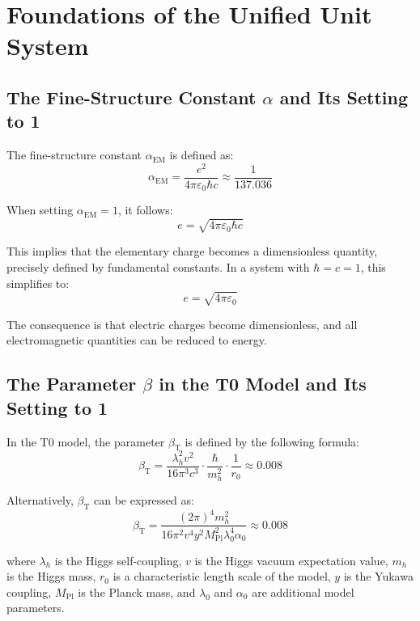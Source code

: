 \documentclass[12pt,a4paper]{article}
\newcommand{\alphaEM}{\alpha_{\text{EM}}}
\newcommand{\betaT}{\beta_{\text{T}}}
\newcommand{\Mpl}{M_{\text{Pl}}}
\begin{document}
	\section{Foundations of the Unified Unit System}
	
	\subsection{The Fine-Structure Constant \(\alpha\) and Its Setting to 1}
	
	The fine-structure constant \(\alphaEM\) is defined as:
	\begin{equation}
		\alphaEM = \frac{e^2}{4\pi\varepsilon_0 \hbar c} \approx \frac{1}{137.036}
	\end{equation}
	
	When setting \(\alphaEM = 1\), it follows:
	\begin{equation}
		e = \sqrt{4\pi\varepsilon_0 \hbar c}
	\end{equation}
	
	This implies that the elementary charge becomes a dimensionless quantity, precisely defined by fundamental constants. In a system with \(\hbar = c = 1\), this simplifies to:
	\begin{equation}
		e = \sqrt{4\pi\varepsilon_0}
	\end{equation}
	
	The consequence is that electric charges become dimensionless, and all electromagnetic quantities can be reduced to energy.
	
	\subsection{The Parameter \(\beta\) in the T0 Model and Its Setting to 1}
	
	In the T0 model, the parameter \(\betaT\) is defined by the following formula:
	\begin{equation}
		\betaT = \frac{\lambda_h^2 v^2}{16\pi^3 c^3} \cdot \frac{\hbar}{m_h^2} \cdot \frac{1}{r_0} \approx 0.008
	\end{equation}
	
	Alternatively, \(\betaT\) can be expressed as:
	\begin{equation}
		\betaT = \frac{(2\pi)^4 m_h^2}{16 \pi^2 v^4 y^2 \Mpl^2 \lambda_0^4 \alpha_0} \approx 0.008
	\end{equation}
	
	where \(\lambda_h\) is the Higgs self-coupling, \(v\) is the Higgs vacuum expectation value, \(m_h\) is the Higgs mass, \(r_0\) is a characteristic length scale of the model, \(y\) is the Yukawa coupling, \(\Mpl\) is the Planck mass, and \(\lambda_0\) and \(\alpha_0\) are additional model parameters.
	
\end{document}
